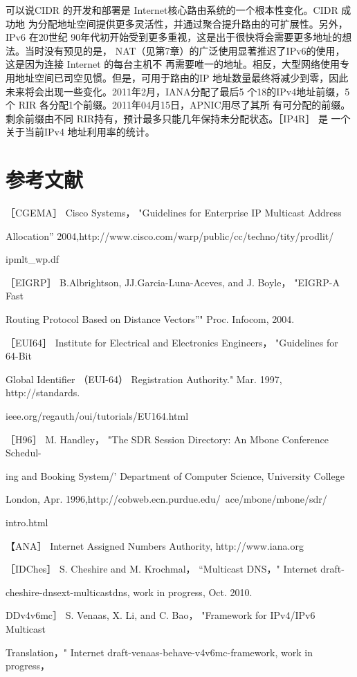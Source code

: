 可以说CIDR 的开发和部署是 Internet核心路由系统的一个根本性变化。CIDR 成功地
为分配地址空间提供更多灵活性，并通过聚合提升路由的可扩展性。另外，IPv6 在20世纪
90年代初开始受到更多重视，这是出于很快将会需要更多地址的想法。当时没有预见的是，
NAT（见第7章）的广泛使用显著推迟了IPv6的使用，这是因为连接 Internet 的每台主机不
再需要唯一的地址。相反，大型网络使用专用地址空间已司空见惯。但是，可用于路由的IP
地址数量最终将减少到零，因此未来将会出现一些变化。2011年2月，IANA分配了最后5
个18的IPv4地址前缀，5个 RIR 各分配1个前缀。2011年04月15日，APNIC用尽了其所
有可分配的前缀。剩余前缀由不同 RIR持有，预计最多只能几年保持未分配状态。［IP4R］ 是
一个关于当前IPv4 地址利用率的统计。

\section{参考文献}
［CGEMA］ Cisco Systems， "Guidelines for Enterprise IP Multicast Address

Allocation” 2004,http://www.cisco.com/warp/public/cc/techno/tity/prodlit/

ipmlt\_wp.df

［EIGRP］ B.Albrightson, JJ.Garcia-Luna-Aceves, and J. Boyle， "EIGRP-A Fast

Routing Protocol Based on Distance Vectors”" Proc. Infocom, 2004.

［EUI64］ Institute for Electrical and Electronics Engineers， "Guidelines for 64-Bit

Global Identifier （EUI-64） Registration Authority." Mar. 1997, http://standards.

ieee.org/regauth/oui/tutorials/EU164.html

［H96］ M. Handley， "The SDR Session Directory: An Mbone Conference Schedul-

ing and Booking System/' Department of Computer Science, University College

London, Apr. 1996,http://cobweb.ecn.purdue.edu/~ace/mbone/mbone/sdr/

intro.html

【ANA］ Internet Assigned Numbers Authority, http://www.iana.org

［IDChes］ S. Cheshire and M. Krochmal， “Multicast DNS，" Internet draft-

cheshire-dnsext-multicastdns, work in progress, Oct. 2010.

DDv4v6mc］ S. Venaas, X. Li, and C. Bao， "Framework for IPv4/IPv6 Multicast

Translation，" Internet draft-venaas-behave-v4v6mc-framework, work in progress，

